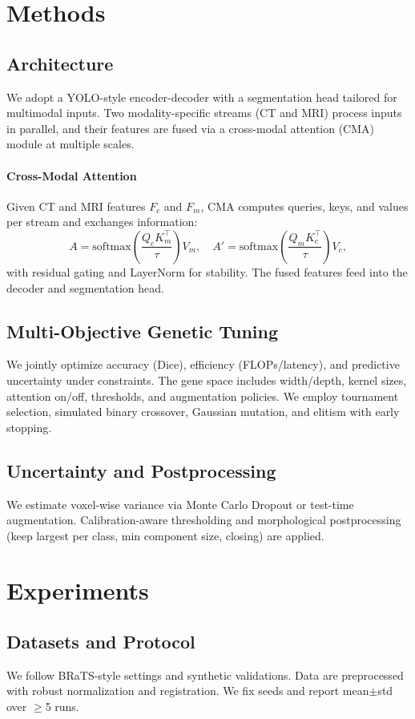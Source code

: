 \section{Methods}
\subsection{Architecture}
We adopt a YOLO-style encoder-decoder with a segmentation head tailored for multimodal inputs. Two modality-specific streams (CT and MRI) process inputs in parallel, and their features are fused via a cross-modal attention (CMA) module at multiple scales.

\paragraph{Cross-Modal Attention}
Given CT and MRI features $F_c$ and $F_m$, CMA computes queries, keys, and values per stream and exchanges information:
\[ A = \mathrm{softmax}\left(\frac{Q_c K_m^\top}{\tau}\right)V_m, \quad A' = \mathrm{softmax}\left(\frac{Q_m K_c^\top}{\tau}\right)V_c, \]
with residual gating and LayerNorm for stability. The fused features feed into the decoder and segmentation head.

\subsection{Multi-Objective Genetic Tuning}
We jointly optimize accuracy (Dice), efficiency (FLOPs/latency), and predictive uncertainty under constraints. The gene space includes width/depth, kernel sizes, attention on/off, thresholds, and augmentation policies. We employ tournament selection, simulated binary crossover, Gaussian mutation, and elitism with early stopping.

\subsection{Uncertainty and Postprocessing}
We estimate voxel-wise variance via Monte Carlo Dropout or test-time augmentation. Calibration-aware thresholding and morphological postprocessing (keep largest per class, min component size, closing) are applied.

\section{Experiments}
\subsection{Datasets and Protocol}
We follow BRaTS-style settings and synthetic validations. Data are preprocessed with robust normalization and registration. We fix seeds and report mean$\pm$std over $\geq$5 runs.

